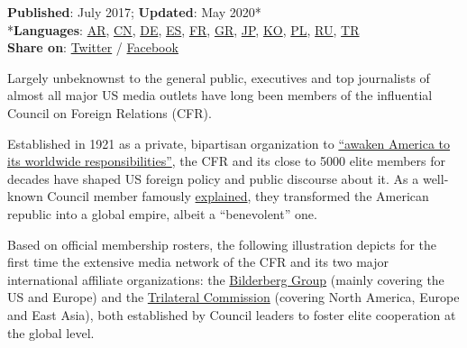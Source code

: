 \textbf{Published}: July 2017; \textbf{Updated}: May 2020*\\
*\textbf{Languages}:
\href{https://swprs.files.wordpress.com/2020/02/american-empire-media-arabic.png}{AR},
\href{https://swprs.files.wordpress.com/2019/12/american-empire-media-chinese.png}{CN},
\href{https://swprs.org/das-american-empire-und-seine-medien/}{DE},
\href{https://swprs.files.wordpress.com/2019/12/american-empire-media-spanish.pdf}{ES},
\href{https://swprs.files.wordpress.com/2019/12/american-empire-media-french.pdf}{FR},
\href{https://swprs.files.wordpress.com/2019/12/american-empire-media-greek.pdf}{GR},
\href{https://swprs.files.wordpress.com/2019/12/american-empire-media-japanese.pdf}{JP},
\href{https://swprs.files.wordpress.com/2019/12/american-empire-media-korean.pdf}{KO},
\href{https://swprs.files.wordpress.com/2019/12/american-empire-media-polish.pdf}{PL},
\href{https://swprs.files.wordpress.com/2019/12/american-empire-media-russian.pdf}{RU},
\href{https://swprs.org/the-american-empire-and-its-media/american-empire-media-turkish/}{TR}\\
\textbf{Share on}:
\href{https://twitter.com/intent/tweet?url=https://swprs.org/the-american-empire-and-its-media/}{Twitter}
/
\href{https://www.facebook.com/share.php?u=https://swprs.org/the-american-empire-and-its-media/}{Facebook}

Largely unbeknownst to the general public, executives and top
journalists of almost all major US media outlets have long been members
of the influential Council on Foreign Relations (CFR).

Established in 1921 as a private, bipartisan organization to
\href{http://www.nytimes.com/1971/11/21/archives/is-it-a-club-seminar-presidium-invisible-government-the-council-on-.html}{``awaken
America to its worldwide responsibilities''}, the CFR and its close to
5000 elite members for decades have shaped US foreign policy and public
discourse about it. As a well-known Council member famously
\href{http://carnegieendowment.org/1998/06/01/benevolent-empire-pub-275}{explained},
they transformed the American republic into a global empire, albeit a
``bene­volent'' one.

Based on official membership rosters, the following illustration depicts
for the first time the extensive media network of the CFR and its two
major international affiliate organizations: the
\href{https://en.wikipedia.org/wiki/Bilderberg_Group}{Bilderberg Group}
(mainly covering the US and Europe) and the
\href{https://en.wikipedia.org/wiki/Trilateral_commission}{Trilateral
Commission} (covering North America, Europe and East Asia), both
established by Council leaders to foster elite cooperation at the global
level.

